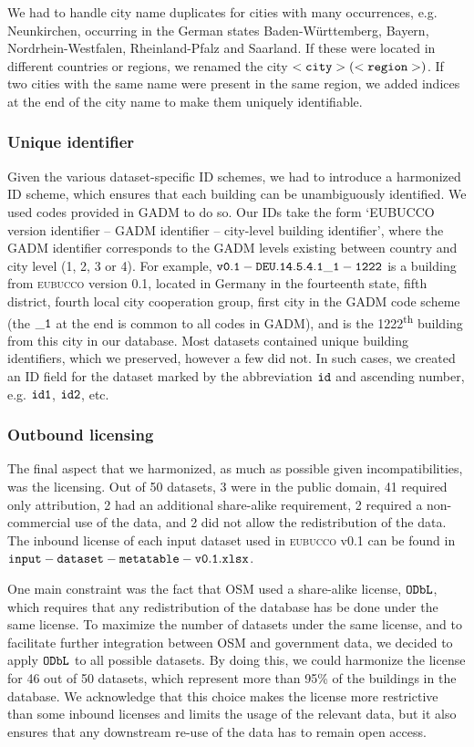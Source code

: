 \documentclass[fleqn,10pt]{wlscirep}
\begin{document}
We had to handle city name duplicates for cities with many occurrences, e.g. Neunkirchen, occurring in the German states Baden-Württemberg, Bayern, Nordrhein-Westfalen, Rheinland-Pfalz and Saarland. If these were located in different countries or regions, we renamed the city $\tt{<city> (<region>)}$. If two cities with the same name were present in the same region, we added indices at the end of the city name to make them uniquely identifiable. 


\subsubsection*{Unique identifier}
Given the various dataset-specific ID schemes, we had to introduce a harmonized ID scheme, which ensures that each building can be unambiguously identified. We used codes provided in GADM to do so.  Our IDs take the form `EUBUCCO version identifier -- GADM identifier -- city-level building identifier', where the GADM identifier corresponds to the GADM levels existing between country and city level (1, 2, 3 or 4). For example, ${\tt v0.1-DEU.14.5.4.1\_1-1222}$ is a building from \textsc{eubucco} version 0.1, located in Germany in the fourteenth state, fifth district, fourth local city cooperation group, first city in the GADM code scheme (the ${\tt \_1}$ at the end is common to all codes in GADM), and is the 1222\textsuperscript{th} building from this city in our database. Most datasets contained unique building identifiers, which we preserved, however a few did not. In such cases, we created an ID field for the dataset marked by the abbreviation $\tt{id}$ and ascending number, e.g. $\tt{id1}$, $\tt{id2}$, etc.

\subsubsection*{Outbound licensing}

The final aspect that we harmonized, as much as possible given incompatibilities, was the licensing. Out of 50 datasets, 3 were in the public domain, 41 required only attribution, 2 had an additional share-alike requirement, 2 required a non-commercial use of the data, and 2 did not allow the redistribution of the data. The inbound license of each input dataset used in \textsc{eubucco} v0.1 can be found in ${\tt input-dataset-metatable-v0.1.xlsx}$.

One main constraint was the fact that OSM used a share-alike license, ${\tt ODbL}$, which requires that any redistribution of the database has be done under the same license. To maximize the number of datasets under the same license, and to facilitate further integration between OSM and government data, we decided to apply ${\tt ODbL}$ to all possible datasets. By doing this, we could harmonize the license for 46 out of 50 datasets, which represent more than 95\% of the buildings in the database. We acknowledge that this choice makes the license more restrictive than some inbound licenses and limits the usage of the relevant data, but it also ensures that any downstream re-use of the data has to remain open access.
\end{document}
